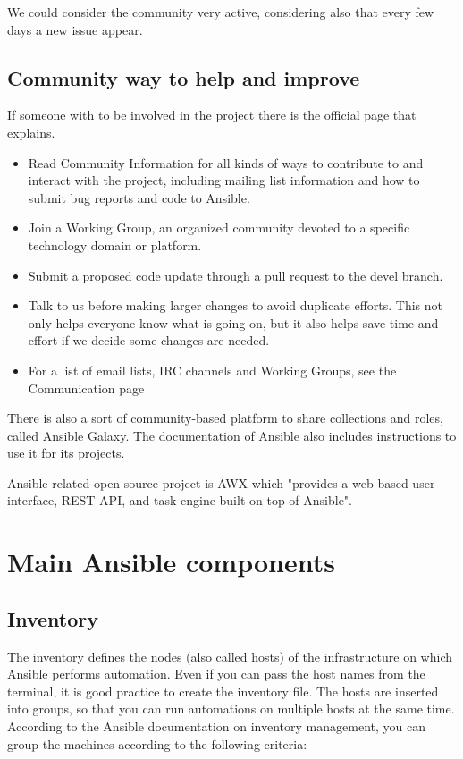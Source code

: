 \documentclass[12pt,a4paper,openright,twoside]{book}
\begin{document}
We could consider the community very active, considering also that every few days a new issue appear.

\subsection{Community way to help and improve}
If someone with to be involved in the project there is the official page that explains\cite {ansibleGithub}.

\begin{itemize}
    \item Read Community Information for all kinds of ways to contribute to and interact with the project, including mailing list information and how to submit bug reports and code to Ansible.
    \item Join a Working Group, an organized community devoted to a specific technology domain or platform.
    \item Submit a proposed code update through a pull request to the devel branch.
    \item Talk to us before making larger changes to avoid duplicate efforts. This not only helps everyone know what is going on, but it also helps save time and effort if we decide some changes are needed.
    \item For a list of email lists, IRC channels and Working Groups, see the Communication page
\end{itemize}

There is also a sort of community-based platform to share collections and roles, called Ansible Galaxy\cite{ansibleGalaxy}.
The documentation of Ansible also includes instructions to use it for its projects.

Ansible-related open-source project is AWX which "provides a web-based user interface, REST API, and task engine built on top of Ansible"\cite{ansibleAWX}.

\section{Main Ansible components}

\subsection{Inventory}
            The inventory defines the nodes (also called hosts) of the infrastructure on which Ansible performs automation.
            Even if you can pass the host names from the terminal, it is good practice to create the inventory file.
            The hosts are inserted into groups, so that you can run automations on multiple hosts at the same time.
            According to the Ansible documentation on inventory management\cite{ansibleDocInventory}, you can group the machines according to the following criteria:
            
\end{document}
